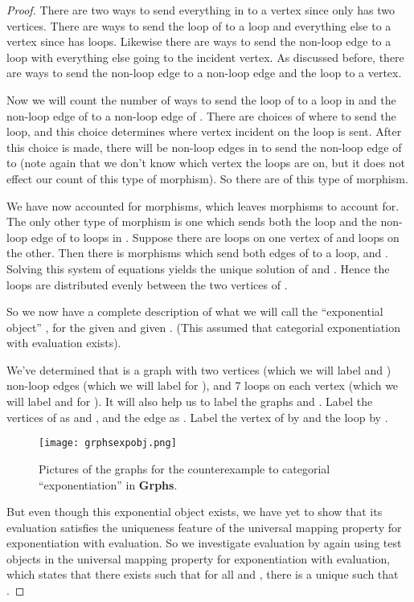 \documentclass[11pt]{article}
\begin{document}
\begin{proof}
There are two ways to send everything in  to a vertex since  only has two vertices. There are  ways to send the loop of  to a loop and everything else to a vertex since  has  loops. Likewise there are  ways to send the non-loop edge to a loop with everything else going to the incident vertex. As discussed before, there are  ways to send the non-loop edge to a non-loop edge and the loop to a vertex.\par
Now we will count the number of ways to send the loop of  to a loop in  and the non-loop edge of  to a non-loop edge of . There are  choices of where to send the loop, and this choice determines where vertex incident on the loop is sent. After this choice is made, there will be  non-loop edges in  to send the non-loop edge of  to (note again that we don't know which vertex the loops are on, but it does not effect our count of this type of morphism). So there are  of this type of morphism.\par
We have now accounted for  morphisms, which leaves  morphisms to account for. The only other type of morphism is one which sends both the loop and the non-loop edge of  to loops in . Suppose there are  loops on one vertex of  and  loops on the other. Then there is  morphisms which send both edges of  to a loop, and . Solving this system of equations yields the unique solution of  and . Hence the  loops are distributed evenly between the two vertices of .\par
So we now have a complete description of what we will call the ``exponential object'' , for the given  and given . (This assumed that categorial exponentiation with evaluation exists).\par
We've determined that  is a graph with two vertices (which we will label  and )  non-loop edges (which we will label  for ), and 7 loops on each vertex (which we will label  and  for ). It will also help us to label the graphs  and . Label the vertices of  as  and , and the edge as . Label the vertex of  by  and the loop by .\par
\begin{figure}[h]
\centering\texttt{[image: grphsexpobj.png]}
\caption{Pictures of the graphs for the counterexample to categorial ``exponentiation'' in \textbf{Grphs}.}
\end{figure}
\par
But even though this exponential object exists, we have yet to show that its evaluation satisfies the uniqueness feature of the universal mapping property for exponentiation with evaluation. So we investigate evaluation by again using test objects in the universal mapping property for exponentiation with evaluation, which states that there exists  such that for all  and , there is a unique  such that .\par

\end{proof}
\end{document}
